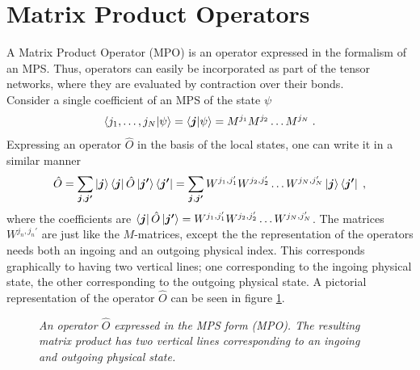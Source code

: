 \section{Matrix Product Operators} \label{sec:MPO}
A Matrix Product Operator (MPO) is an operator expressed in the formalism of an MPS. Thus, operators can easily be incorporated as part of the tensor networks, where they are evaluated by contraction over their bonds.\\
Consider a single coefficient of an MPS of the state $\psi$
\begin{equation}
	\braket{j_1 , \ldots , j_N | \psi} = \braket{\boldsymbol{j} | \psi} = M^{j_1} M^{j_2} \ldots M^{j_N} \; . 
\end{equation}
Expressing an operator $\hat{O}$ in the basis of the local states, one can write it in a similar manner
\begin{equation}
	\hat{O} = \sum_{\boldsymbol{j} , \boldsymbol{j'}} \ket{\boldsymbol{j}} \bra{\boldsymbol{j}} \hat{O} \ket{\boldsymbol{j'}} \bra{\boldsymbol{j'}} = \sum_{\boldsymbol{j} , \boldsymbol{j'}} W^{j_1 , j_1 '} W^{j_2 , j_2 '} \ldots W^{j_N , j_N '} \ket{\boldsymbol{j}} \bra{\boldsymbol{j '}} \; ,
	\label{eq:MPOrep}
\end{equation}
where the coefficients are $\bra{\boldsymbol{j}} \hat{O} \ket{\boldsymbol{j'}} = W^{j_1 , j_1 '} W^{j_2 , j_2 '} \ldots W^{j_N , j_N '}$. The matrices $W^{j_n , j_n '}$ are just like the $M$-matrices, except the the representation of the operators needs both an ingoing and an outgoing physical index. This corresponds graphically to having two vertical lines; one corresponding to the ingoing physical state, the other corresponding to the outgoing physical state. A pictorial representation of the operator $\hat{O}$ can be seen in figure \ref{fig:MPOchain}.
\begin{figure}[h!]
	\centering
	
	\caption{\textit{An operator $\hat{O}$ expressed in the MPS form (MPO). The resulting matrix product has two vertical lines corresponding to an ingoing and outgoing physical state.}}
	\label{fig:MPOchain}
\end{figure}

